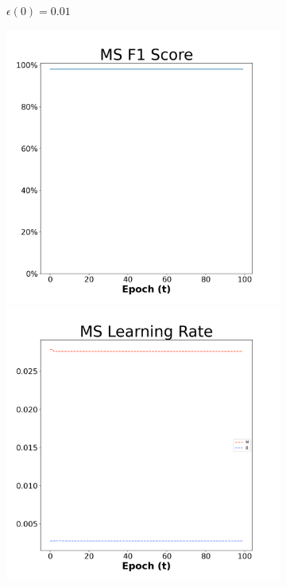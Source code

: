 \begin{figure}[H]
\begin{subfigure}{0.3\textwidth}
  \caption{$\epsilon(0)=0.01$}
\end{subfigure}\hfil %
\begin{subfigure}{0.3\textwidth}
  \includegraphics[width=\linewidth]{images/exper2/breast/MS_0.03_f1.png}
  \includegraphics[width=\linewidth]{images/exper2/breast/MS_0.03_lr.png}

\end{subfigure}
\end{figure}
